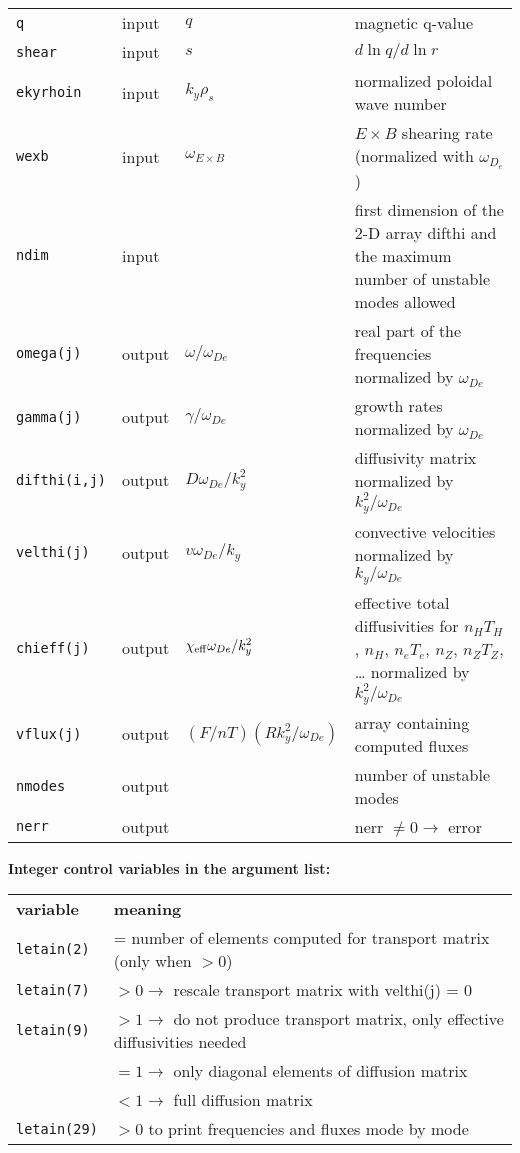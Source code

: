 \begin{center}
\begin{tabular}{lllp{3.0in}}
{\tt q}         & input & $ q $ & magnetic q-value \\
{\tt shear}     & input & $ s $ & $ d \ln q / d \ln r $ \\
{\tt ekyrhoin}  & input & $ k_y \rho_s $ & normalized poloidal
                    wave number \\
{\tt wexb}      & input & $\omega_{E\times B}$& $E\times B$ shearing rate 
(normalized with $\omega_{D_e}$) \\
{\tt ndim} & input & & first dimension of the 2-D array difthi
               and the maximum number of unstable modes allowed \\
{\tt omega(j)}  & output & $\omega / \omega_{De} $ &
     real part of the frequencies normalized by $ \omega_{De} $ \\
{\tt gamma(j)}  & output & $\gamma / \omega_{De} $ &
     growth rates normalized by $ \omega_{De} $ \\
{\tt difthi(i,j)}      & output & $ D \omega_{De} / k_y^2 $
      & diffusivity matrix normalized by $ k_y^2 / \omega_{De} $ \\
{\tt velthi(j)}      & output & $ v \omega_{De} / k_y $
      & convective velocities normalized by $ k_y / \omega_{De} $ \\
{\tt chieff(j)} & output & $ \chi_{\rm eff} \omega_{De} / k_y^2 $ 
      & effective total diffusivities
        for $ n_H T_H $, $ n_H $, $ n_e T_e $, 
        $ n_Z $, $ n_Z T_Z $, \ldots
        normalized by $ k_y^2 / \omega_{De} $ \\
{\tt vflux(j)}   & output & $ ({F}/{nT})({R k_y^2}/{\omega_{De}}) $
   & array containing computed fluxes \\
{\tt nmodes} & output & & number of unstable modes \\
{\tt nerr}       & output & & nerr $\neq 0 \rightarrow$ error\\  
\end{tabular}
\end{center}
\newpage
\renewcommand{\arraystretch}{1.0}
\begin{center}
{\bf Integer control variables in the argument list:}
\begin{tabular}{lp{6.0in}}
{\bf variable} & {\bf meaning} \\
{\tt letain(2)} & = number of elements computed for transport matrix
                    (only when $> 0$) \\
{\tt letain(7)} &$ > 0 \rightarrow$ rescale transport matrix with velthi(j) = 0 \\
{\tt letain(9)} &$ > 1 \rightarrow$ do not produce transport matrix, only 
                       effective diffusivities needed \\
                & $ = 1 \rightarrow$ only diagonal elements of diffusion
                          matrix \\
                & $ < 1 \rightarrow$ full diffusion matrix \\
{\tt letain(29)} & $ > 0 $ to print frequencies and fluxes mode by mode \\
\end{tabular}
\end{center}

